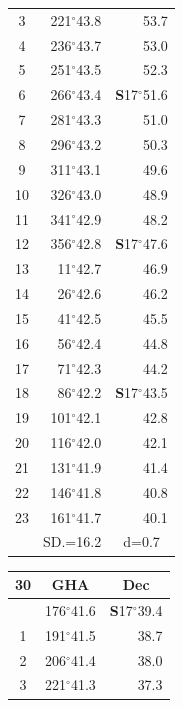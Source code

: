 \documentclass[10pt, a4paper]{report}
\begin{document}
\begin{scriptsize}
\begin{tabular*}{0.2\textwidth}[t]{@{\extracolsep{\fill}}|c|rr|}
3 & 221$^\circ$43.8 & \raisebox{0.24ex}{\boldmath$\cdot$~\boldmath$\cdot$~~}53.7\\
4 & 236$^\circ$43.7 & 53.0\\
5 & 251$^\circ$43.5 & 52.3\\[2Pt]
6 & 266$^\circ$43.4 & \textbf{S}17$^\circ$51.6\\
7 & 281$^\circ$43.3 & 51.0\\
8 & 296$^\circ$43.2 & 50.3\\
9 & 311$^\circ$43.1 & \raisebox{0.24ex}{\boldmath$\cdot$~\boldmath$\cdot$~~}49.6\\
10 & 326$^\circ$43.0 & 48.9\\
11 & 341$^\circ$42.9 & 48.2\\[2Pt]
12 & 356$^\circ$42.8 & \textbf{S}17$^\circ$47.6\\
13 & 11$^\circ$42.7 & 46.9\\
14 & 26$^\circ$42.6 & 46.2\\
15 & 41$^\circ$42.5 & \raisebox{0.24ex}{\boldmath$\cdot$~\boldmath$\cdot$~~}45.5\\
16 & 56$^\circ$42.4 & 44.8\\
17 & 71$^\circ$42.3 & 44.2\\[2Pt]
18 & 86$^\circ$42.2 & \textbf{S}17$^\circ$43.5\\
19 & 101$^\circ$42.1 & 42.8\\
20 & 116$^\circ$42.0 & 42.1\\
21 & 131$^\circ$41.9 & \raisebox{0.24ex}{\boldmath$\cdot$~\boldmath$\cdot$~~}41.4\\
22 & 146$^\circ$41.8 & 40.8\\
23 & 161$^\circ$41.7 & 40.1\\
\hline
\rule{0pt}{2.4ex} & \multicolumn{1}{c}{SD.=16.2} & \multicolumn{1}{c|}{d=0.7}\\
\hline
\end{tabular*}\noindent
\begin{tabular*}{0.2\textwidth}[t]{@{\extracolsep{\fill}}|c|rr|}
\hline
\multicolumn{1}{|c|}{\rule{0pt}{2.6ex}\textbf{30}} & \multicolumn{1}{c}{\textbf{GHA}} & \multicolumn{1}{c|}{\textbf{Dec}}\\
\hline\rule{0pt}{2.6ex}\noindent
0 & 176$^\circ$41.6 & \textbf{S}17$^\circ$39.4\\
1 & 191$^\circ$41.5 & 38.7\\
2 & 206$^\circ$41.4 & 38.0\\
3 & 221$^\circ$41.3 & \raisebox{0.24ex}{\boldmath$\cdot$~\boldmath$\cdot$~~}37.3\\

\end{tabular*}
\end{scriptsize}
\end{document}
